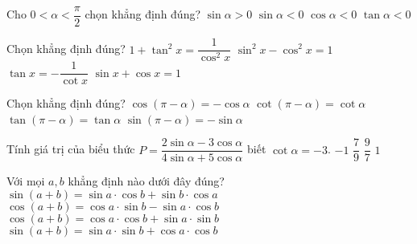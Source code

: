 \begin{ex}%
    Cho $0<\alpha<\dfrac{\pi}{2}$ chọn khẳng định đúng?
    \choice
    {\True$\sin\alpha>0$}
    {$\sin\alpha<0$}
    {$\cos\alpha<0$}
    {$\tan\alpha<0$}
\end{ex}

\begin{ex}%
    Chọn khẳng định đúng?
    \choice
    {\True $1+\tan ^2x=\dfrac{1}{\cos ^2x}$}
    {$\sin ^2x-\cos ^2x=1$}
    {$\tan x=-\dfrac{1}{\cot x}$}
    {$\sin x+\cos x=1$}
\end{ex}

\begin{ex}%
    Chọn khẳng định đúng?
    \choice
    {\True $\cos(\pi -\alpha)=-\cos \alpha$}
    {$\cot(\pi -\alpha)=\cot \alpha$}
    {$\tan(\pi -\alpha)=\tan \alpha$}
    {$\sin(\pi -\alpha)=-\sin \alpha$}
\end{ex}
\begin{ex}%
Tính giá trị của biểu thức $P=\dfrac{2\sin\alpha-3\cos\alpha}{4\sin\alpha+5\cos\alpha}$ biết $\cot\alpha=-3$.
	\choice
	{\True $-1$}
	{$\dfrac{7}{9}$}
	{$\dfrac{9}{7}$}
	{$1$}
\end{ex}

\begin{ex}%
Với mọi $a,b$ khẳng định nào dưới đây đúng?
\choice
{\True $\sin\left(a+b\right)=\sin a\cdot\cos b+\sin b\cdot\cos a$}
{$\cos\left(a+b\right)=\cos a\cdot \sin b-\sin a\cdot\cos b$}
{$\cos\left(a+b\right)=\cos a\cdot\cos b+\sin a\cdot \sin b$}
{$\sin\left(a+b\right)=\sin a\cdot \sin b+\cos a\cdot\cos b$}
\end{ex}

